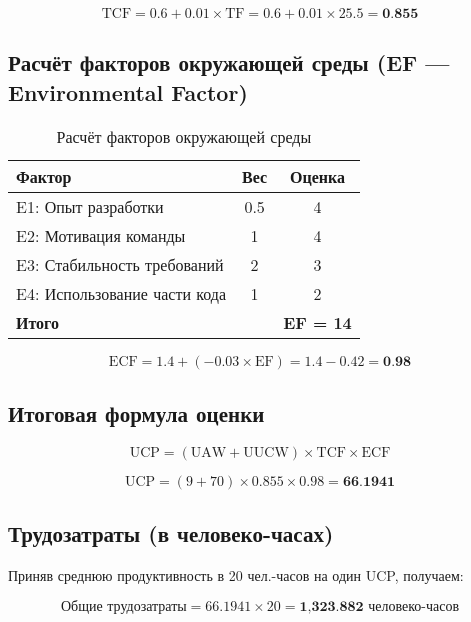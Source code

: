 \documentclass[14pt, russian]{matmex-diploma-custom}
\begin{document}
\begin{equation}
\text{TCF} = 0.6 + 0.01 \times \text{TF} = 0.6 + 0.01 \times 25.5 = \textbf{0.855}
\end{equation}


\subsection{Расчёт факторов окружающей среды (EF — Environmental Factor)}

\begin{table}[H]
\centering
\begin{tabular}{|p{6.5cm}|c|c|}
\hline
Фактор & Вес & Оценка \\
\hline
E1: Опыт разработки & 0.5 & 4 \\
E2: Мотивация команды & 1 & 4 \\
E3: Стабильность требований & 2 & 3 \\
E4: Использование части кода & 1 & 2 \\
\hline
\textbf{Итого} & & \textbf{EF = 14} \\
\hline
\end{tabular}
\caption{Расчёт факторов окружающей среды}
\end{table}

\begin{equation}
    \text{ECF} = 1.4 + (-0.03 \times \text{EF}) = 1.4 - 0.42 = \textbf{0.98}
\end{equation}

\subsection{Итоговая формула оценки}

\begin{equation}
    \text{UCP} = (\text{UAW} + \text{UUCW}) \times \text{TCF} \times \text{ECF}
\end{equation}

\begin{equation}
    \text{UCP} = (9 + 70) \times 0.855 \times 0.98 = \textbf{66.1941}
\end{equation}

\subsection{Трудозатраты (в человеко-часах)}

Приняв среднюю продуктивность в 20 чел.-часов на один UCP, получаем:

\begin{equation}
    \text{Общие трудозатраты} = 66.1941 \times 20 = \textbf{1,323.882 человеко-часов}
\end{equation}
\end{document}

